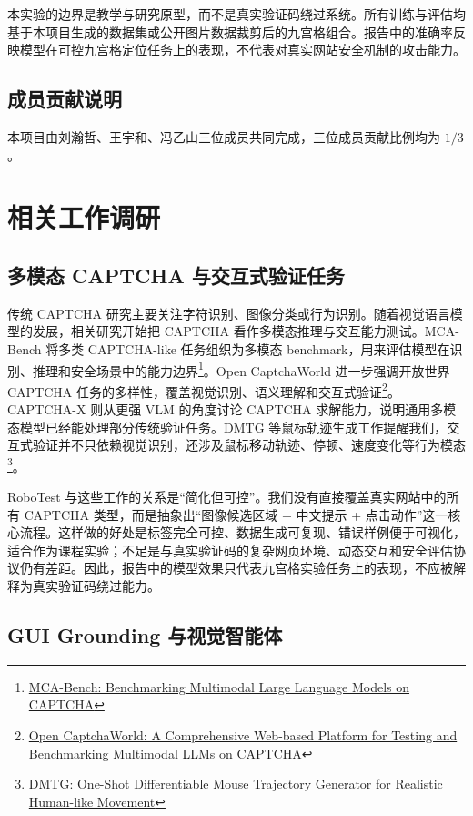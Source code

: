 \documentclass[UTF8,a4paper,12pt,fontset=fandol]{ctexart}
\begin{document}
本实验的边界是教学与研究原型，而不是真实验证码绕过系统。所有训练与评估均基于本项目生成的数据集或公开图片数据裁剪后的九宫格组合。报告中的准确率反映模型在可控九宫格定位任务上的表现，不代表对真实网站安全机制的攻击能力。

\subsection{成员贡献说明}

本项目由刘瀚哲、王宇和、冯乙山三位成员共同完成，三位成员贡献比例均为 $1/3$。

\section{相关工作调研}

\subsection{多模态 CAPTCHA 与交互式验证任务}

传统 CAPTCHA 研究主要关注字符识别、图像分类或行为识别。随着视觉语言模型的发展，相关研究开始把 CAPTCHA 看作多模态推理与交互能力测试。MCA-Bench 将多类 CAPTCHA-like 任务组织为多模态 benchmark，用来评估模型在识别、推理和安全场景中的能力边界\footnote{\href{https://arxiv.org/abs/2506.05982}{MCA-Bench: Benchmarking Multimodal Large Language Models on CAPTCHA}}。Open CaptchaWorld 进一步强调开放世界 CAPTCHA 任务的多样性，覆盖视觉识别、语义理解和交互式验证\footnote{\href{https://arxiv.org/abs/2505.24878}{Open CaptchaWorld: A Comprehensive Web-based Platform for Testing and Benchmarking Multimodal LLMs on CAPTCHA}}。CAPTCHA-X 则从更强 VLM 的角度讨论 CAPTCHA 求解能力，说明通用多模态模型已经能处理部分传统验证任务。DMTG 等鼠标轨迹生成工作提醒我们，交互式验证并不只依赖视觉识别，还涉及鼠标移动轨迹、停顿、速度变化等行为模态\footnote{\href{https://arxiv.org/abs/2410.18233}{DMTG: One-Shot Differentiable Mouse Trajectory Generator for Realistic Human-like Movement}}。

RoboTest 与这些工作的关系是“简化但可控”。我们没有直接覆盖真实网站中的所有 CAPTCHA 类型，而是抽象出“图像候选区域 + 中文提示 + 点击动作”这一核心流程。这样做的好处是标签完全可控、数据生成可复现、错误样例便于可视化，适合作为课程实验；不足是与真实验证码的复杂网页环境、动态交互和安全评估协议仍有差距。因此，报告中的模型效果只代表九宫格实验任务上的表现，不应被解释为真实验证码绕过能力。

\subsection{GUI Grounding 与视觉智能体}
\end{document}
